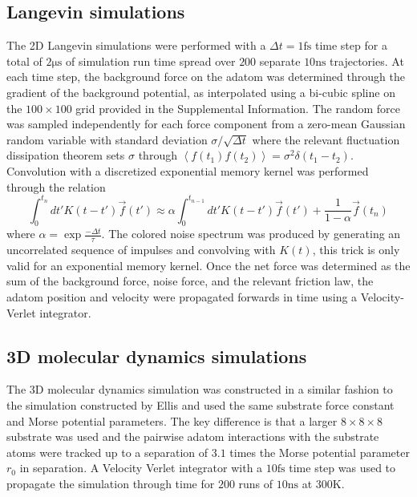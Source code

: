 \documentclass[7pt]{article}
\newcommand{\ns}{\si{\nano\second}}
\newcommand{\fs}{\si{\femto\second}}
\newcommand{\us}{\si{\micro\second}}
\newcommand{\K}{\si{\kelvin}}
\begin{document}
\subsection*{Langevin simulations}

The 2D Langevin simulations were performed with a $\Delta{t} = 1\fs$ time step for a total of $2\us$ of simulation run time spread over $200$ separate $10\ns$ trajectories. At each time step, the background force on the adatom was determined through the gradient of the background potential, as interpolated using a bi-cubic spline on the $100\times100$ grid provided in the Supplemental Information. The random force was sampled independently for each force component from a zero-mean Gaussian random variable with standard deviation $\sigma/\sqrt{\Delta{t}}$ where the relevant fluctuation dissipation theorem sets $\sigma$ through $\left<f\left(t_1\right)f\left(t_2\right)\right>=\sigma^2\delta\left(t_1-t_2\right)$. Convolution with a discretized exponential memory kernel was performed through the relation
\begin{equation}
	\int_0^{t_n} dt' K\left(t-t'\right) \vec{f}(t') \approx \alpha \int_0^{t_{n-1}} dt' K\left(t-t'\right) \vec{f}(t') + \frac{1}{1-\alpha} \vec{f}\left(t_n\right)
\end{equation}
where $\alpha = \exp{\frac{-\Delta{t}}{\tau}}$. The colored noise spectrum was produced by generating an uncorrelated sequence of impulses and convolving with $K(t)$, this trick is only valid for an exponential memory kernel. Once the net force was determined as the sum of the background force, noise force, and the relevant friction law, the adatom position and velocity were propagated forwards in time using a Velocity-Verlet integrator\cite{Verlet}.

\subsection*{3D molecular dynamics simulations}

The 3D molecular dynamics simulation was constructed in a similar fashion to the simulation constructed by Ellis\cite{Ellis} and used the same substrate force constant and Morse potential parameters. The key difference is that a larger $8\times8\times8$ substrate was used and the pairwise adatom interactions with the substrate atoms were tracked up to a separation of $3.1$ times the Morse potential parameter $r_0$ in separation. A Velocity Verlet integrator\cite{Verlet} with a $10\fs$ time step was used to propagate the simulation through time for $200$ runs of $10\ns$ at $300\K$.
\end{document}
